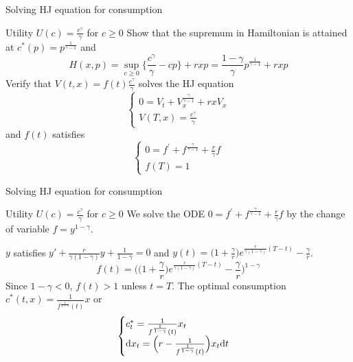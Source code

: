 \documentclass[color=usenames,dvipsnames]{beamer}
\newcommand{\dt}{\text{\normalfont d}t}
\newcommand{\dx}{\text{\normalfont d}x}
\begin{document}
\begin{frame}{Solving HJ equation for consumption}
\begin{block}
    {Utility $U(c)=\frac{c^{\gamma}}{\gamma}$ for $c\ge0$}
    Show that the supremum in Hamiltonian is attained at $c^*(p)=p^{\frac{1}{\gamma-1}}$ and
    \[
        H(x,p)=\sup_{c\ge0}\Bigg\{\frac{c^{\gamma}}{\gamma}-cp\Bigg\}+rxp=\frac{1-\gamma}{\gamma}
        p^{\frac{1}{\gamma-1}}+rxp
    \]
    Verify that  $V(t,x)=f(t)\frac{c^{\gamma}}{\gamma}$ solves the HJ equation 
    \[
    \begin{cases}
        0=V_t+V_x^{\frac{\gamma}{\gamma-1}}+rxV_x\\
        V(T,x)=\frac{c^{\gamma}}{\gamma}
    \end{cases}
    \]
    and $f(t)$ satisfies
    \[
    \begin{cases}
        0=f^{\prime}+f^{\frac{\gamma}{\gamma-1}}+\frac{r}{\gamma}f\\
        f(T)=1
    \end{cases}
    \]
\end{block}
\end{frame}
\begin{frame}{Solving HJ equation for consumption}
\begin{block}
    {Utility $U(c)=\frac{c^{\gamma}}{\gamma}$ for $c\ge0$}
    We solve the ODE
    $0=f^{\prime}+f^{\frac{\gamma}{\gamma-1}}+\frac{r}{\gamma}f$
    by the change of variable $f = y^{1-\gamma}$. 
    
    $y$ satisfies $y' + \frac{r}{\gamma(1-\gamma)} y + \frac{1}{1-\gamma} = 0$ and  $y(t) = \Big(1+\frac{\gamma}{r}\Big) e^{\frac{r}{\gamma(1-\gamma)}(T-t)} - \frac{\gamma}{r}$. 
    \[
    f(t)=\Bigg(\Big(1+\frac{\gamma}{r}\Big) e^{\frac{r}{\gamma(1-\gamma)}(T-t)} - \frac{\gamma}{r}\Bigg)^{1-\gamma}
    \]
    Since $1-\gamma<0$, $f(t)>1$ unless $t=T$. The optimal consumption $c^*(t,x)=\frac{1}{f^{\frac{1}{1-\gamma}}(t)}x$ or
    \[
    \begin{cases}
       c^*_t=\frac{1}{f^{\frac{1}{1-\gamma}}(t)}x_t\\
       \dx_t = \Big(r - \frac{1}{f^{\frac{1}{1-\gamma}}(t)}\Big)x_t\dt
    \end{cases}
    \]
\end{block}
\end{frame}
\end{document}
